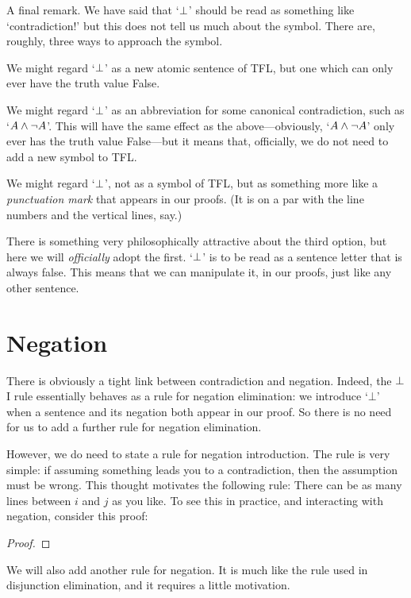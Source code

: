 A final remark. We have said that `$\bot$' should be read as something like `contradiction!' but this does not tell us much about the symbol. There are, roughly, three ways to approach the symbol. 
	\begin{ebullet}
		\item We might regard `$\bot$' as a new atomic sentence of TFL, but one which can only ever have the truth value False. 
		\item We might regard `$\bot$' as an abbreviation for some canonical contradiction, such as `$A \wedge \neg A$'. This will have the same effect as the above---obviously, `$A \wedge \neg A$' only ever has the truth value False---but it means that, officially, we do not need to add a new symbol to TFL.
		\item We might regard `$\bot$', not as a symbol of TFL, but as something more like a \emph{punctuation mark} that appears in our proofs. (It is on a par with the line numbers and the vertical lines, say.)
	\end{ebullet}
There is something very philosophically attractive about the third option, but here we will \emph{officially} adopt the first. `$\bot$' is to be read as a sentence letter that is always false. This means that we can manipulate it, in our proofs, just like any other sentence.


\section{Negation}
There is obviously a tight link between contradiction and negation. Indeed, the $\bot$I rule essentially behaves as a rule for negation elimination: we introduce `$\bot$' when a sentence and its negation both appear in our proof. So there is no need for us to add a further rule for negation elimination. 

However, we do need to state a rule for negation introduction. The rule is very simple: if assuming something leads you to a contradiction, then the assumption must be wrong. This thought motivates the following rule:
There can be as many lines between $i$ and $j$ as you like. To see this in practice, and interacting with negation, consider this proof:
	\begin{proof}
		\open
		\close
	\end{proof}
We will also add another rule for negation. It is much like the rule used in disjunction elimination, and it requires a little motivation. 

